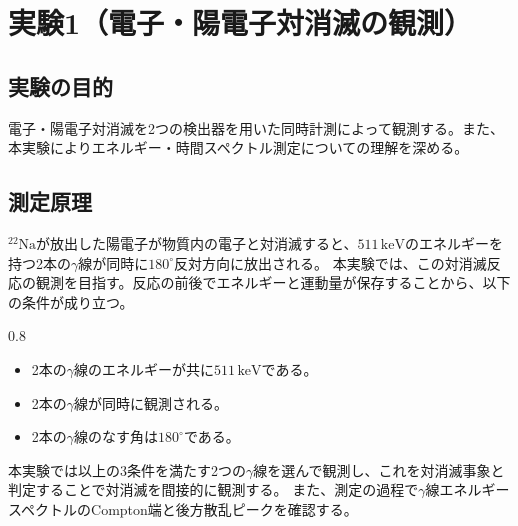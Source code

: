 \documentclass[11pt, titlepage, openany]{ltjsbook}
\begin{document}
\chapter{実験1（電子・陽電子対消滅の観測）}
\label{Exp1}
\section{実験の目的}
電子・陽電子対消滅を2つの検出器を用いた同時計測によって観測する。また、本実験によりエネルギー・時間スペクトル測定についての理解を深める。
\section{測定原理}
$^{22}\mathrm{Na}$が放出した陽電子が物質内の電子と対消滅すると、$511\,\mathrm{keV}$のエネルギーを持つ2本の$\gamma$線が同時に$180^{\circ}$反対方向に放出される。
本実験では、この対消滅反応の観測を目指す。反応の前後でエネルギーと運動量が保存することから、以下の条件が成り立つ。
\begin{center}
    \begin{varwidth}{0.8\textwidth}
        \begin{itemize}
            \item[\textbf{条件1：}] 2本の$\gamma$線のエネルギーが共に$511\,\mathrm{keV}$である。
            \item[\textbf{条件2：}] 2本の$\gamma$線が同時に観測される。
            \item[\textbf{条件3：}] 2本の$\gamma$線のなす角は$180^{\circ}$である。 
        \end{itemize}
    \end{varwidth}
\end{center}
本実験では以上の3条件を満たす2つの$\gamma$線を選んで観測し、これを対消滅事象と判定することで対消滅を間接的に観測する。
また、測定の過程で$\gamma$線エネルギースペクトルのCompton端と後方散乱ピークを確認する。
\end{document}
